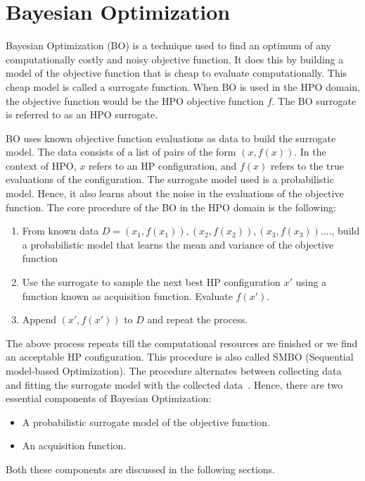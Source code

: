 \documentclass[12pt, twoside, ngerman]{report}
\begin{document}
\section{Bayesian Optimization}
\label{sec:BayesianOptimization}

Bayesian Optimization (BO) is a technique used to find an optimum of any computationally costly and noisy objective function.
It does this by building a model of the objective function that is cheap to evaluate computationally. This cheap model is called a surrogate function.
When BO is used in the HPO domain, the objective function would be the HPO objective function $f$. The BO surrogate is referred to as an HPO surrogate.

BO uses known objective function evaluations as data to build the surrogate model. The data consists of a list of pairs of the form $(x, f(x))$. In the context of HPO, $x$ refers to an HP configuration, and $f(x)$ refers to the true evaluations of the configuration.
The surrogate model used is a probabilistic model. Hence, it also learns about the noise in the evaluations of the objective function.
The core procedure of the BO in the HPO domain is the following:
\begin{enumerate}
\item From known data $D = {(x_1, f(x_1)), (x_2, f(x_2)), (x_3, f(x_3)) .... }$, build a probabilistic model that learns the mean and variance of the objective function
\item Use the surrogate to sample the next best HP configuration $x'$ using a function known as acquisition function. Evaluate $f(x')$.
\item Append $(x', f(x'))$ to $D$ and repeat the process.
\end{enumerate}

The above process repeats till the computational resources are finished or we find an acceptable HP configuration.
This procedure is also called SMBO (Sequential model-based Optimization).
The procedure alternates between collecting data and fitting the surrogate model with the collected data~\cite{SMBOPaper}.
Hence, there are two essential components of Bayesian Optimization:
\begin{itemize}
\item A probabilistic surrogate model of the objective function.
\item An acquisition function.
\end{itemize}
Both these components are discussed in the following sections.
\end{document}
